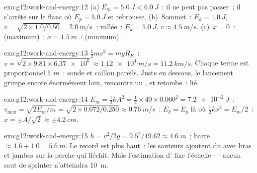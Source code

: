 \begin{solution}{exo:g12:work-and-energy:12}
(a) $E_m = \qty{5.0}{J} < \qty{6.0}{J}$~: il ne peut pas passer~; il
s'arrête sur le flanc où $E_p = \qty{5.0}{J}$ et rebrousse. (b)~Sommet~:
$E_k = \qty{1.0}{J}$, $v = \sqrt{2 \times 1.0/0.50} = \qty{2.0}{m/s}$~;
vallée~: $E_k = \qty{5.0}{J}$, $v \approx \qty{4.5}{m/s}$. (c)~$x = 0$~:
 (maximum)~; $x = \qty{1.5}{m}$~:
 (minimum).
\end{solution}

\begin{solution}{exo:g12:work-and-energy:13}
$\tfrac12 mv^2 = mgR_E$~:
$v = \sqrt{2 \times 9.81 \times \num{6.37e6}} \approx \qty{1.12e4}{m/s}
= \qty{11.2}{km/s}$. Chaque terme est proportionnel à $m$~: sonde et
caillou pareils. Juste en dessous, le lancement grimpe encore
énormément loin, rencontre un ,
et retombe~: lié.
\end{solution}

\begin{solution}{exo:g12:work-and-energy:14}
$E_m = \tfrac12 kA^2 = \tfrac12 \times 40 \times 0.060^2 =
\qty{7.2e-2}{J}$~; $v_{\max} = \sqrt{2E_m/m} =
\sqrt{2 \times 0.072/0.250} \approx \qty{0.76}{m/s}$~;
$E_k = E_p$ là où $\tfrac12 kx^2 = E_m/2$~: $x = \pm A/\sqrt 2 \approx
\pm\qty{4.2}{cm}$.
\end{solution}

\begin{solution}{exo:g12:work-and-energy:15}
$h = v^2/2g = 9.5^2/19.62 \approx \qty{4.6}{m}$~; barre $\approx
4.6 + 1.0 = \qty{5.6}{m}$. Le record est plus haut~: les sauteurs
ajoutent du  avec bras et jambes sur la perche
qui fléchit. Mais l'estimation d' fixe
l'échelle --- aucun saut de sprinter n'atteindra \qty{10}{m}.
\end{solution}

